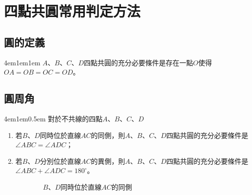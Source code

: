 \documentclass[12pt]{article}
\begin{document}
\section{四點共圓常用判定方法}
\subsection{圓的定義}
\begin{mybox}[定理]{4em}{1em}{1em}
    $A$、$B$、$C$、$D$四點共圓的充分必要條件是存在一點$O$使得$OA=OB=OC=OD$。
\end{mybox}
\subsection{圓周角}
\begin{mybox}[定理]{4em}{1em}{0.5em}
    對於不共線的四點$A$、$B$、$C$、$D$
    \begin{enumerate}[label= (\roman*.), itemsep=0.3em]
        \item 若$B$、$D$同時位於直線$AC$的同側，則$A$、$B$、$C$、$D$四點共圓的充分必要條件是$\angle{ABC}=\angle{ADC}$；
        \item 若$B$、$D$分別位於直線$AC$的異側，則$A$、$B$、$C$、$D$四點共圓的充分必要條件是$\angle{ABC}+\angle{ADC}=180^{\circ}$。
    \end{enumerate}
    \begin{figure}[H]
        \centering
        \begin{subfigure}[b]{0.45\textwidth}
            \centering
            \caption{$B$、$D$同時位於直線$AC$的同側}
            \label{fig:Angle_s2.2-1}
        \end{subfigure}
        \hfill %
        \begin{subfigure}[b]{0.45\textwidth}

\end{subfigure}
\end{figure}
\end{mybox}
\end{document}
